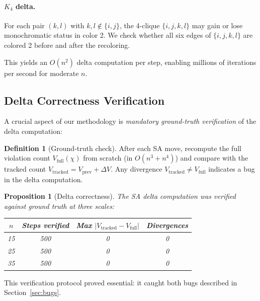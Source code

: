 \documentclass[11pt,a4paper]{article}
\newtheorem{proposition}[theorem]{Proposition}
\theoremstyle{definition}
\newtheorem{definition}[theorem]{Definition}
\theoremstyle{remark}
\begin{document}
\paragraph{$K_4$ delta.}
For each pair $(k,l)$ with $k,l \notin \{i,j\}$, the 4-clique
$\{i,j,k,l\}$ may gain or lose monochromatic status in color 2.
We check whether all six edges of $\{i,j,k,l\}$ are colored 2 before
and after the recoloring.

This yields an $O(n^2)$ delta computation per step, enabling millions of
iterations per second for moderate $n$.

\subsection{Delta Correctness Verification}\label{sec:delta-verify}

A crucial aspect of our methodology is \emph{mandatory ground-truth
verification} of the delta computation:

\begin{definition}[Ground-truth check]\label{def:ground-truth}
After each SA move, recompute the full violation count $V_{\text{full}}(\chi)$
from scratch (in $O(n^3 + n^4)$) and compare with the tracked count
$V_{\text{tracked}} = V_{\text{prev}} + \Delta V$.
Any divergence $V_{\text{tracked}} \ne V_{\text{full}}$ indicates a bug
in the delta computation.
\end{definition}

\begin{proposition}[Delta correctness]\label{prop:delta-correct}
The SA delta computation was verified against ground truth at three scales:
\begin{center}
\begin{tabular}{@{}cccc@{}}
\toprule
$n$ & Steps verified & Max $|V_{\text{tracked}} - V_{\text{full}}|$ & Divergences \\
\midrule
15 & 500 & 0 & 0 \\
25 & 500 & 0 & 0 \\
35 & 500 & 0 & 0 \\
\bottomrule
\end{tabular}
\end{center}
\end{proposition}

This verification protocol proved essential: it caught both bugs
described in Section~\ref{sec:bugs}.


\end{document}

